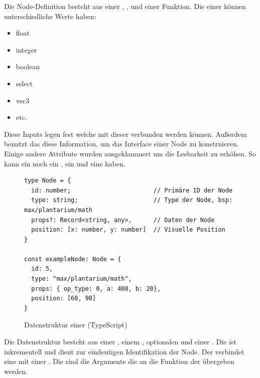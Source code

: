 \documentclass[ngerman]{article}
\begin{document}
Die Node-Definition besteht aus einer , ,  und einer  Funktion. Die  einer  können unterschiedliche  Werte haben:

\begin{itemize}
  \setlength\itemsep{0.0em}
  \item float
  \item integer
  \item boolean
  \item select
  \item vec3
  \item etc.
\end{itemize}

Diese Inputs legen fest welche  mit dieser  verbunden werden können. 
Außerdem benutzt das  diese Information, um das Interface einer Node zu konstruieren.
\br
Einige andere Attribute wurden ausgeklammert um die Lesbarkeit zu erhöhen. So kann ein  noch ein , ein  und eine  haben.

\pagebreak

\begin{figure}[htbp]
  \begin{code}
    \begin{verbatim}
type Node = {
  id: number;                       // Primäre ID der Node
  type: string;                     // Type der Node, bsp: max/plantarium/math
  props?: Record<string, any>,      // Daten der Node
  position: [x: number, y: number]  // Visuelle Position
}

const exampleNode: Node = {
  id: 5,
  type: "max/plantarium/math",
  props: { op_type: 0, a: 400, b: 20},
  position: [60, 90]
}

    \end{verbatim}
  \end{code}

  \caption{Datenstruktur einer  (TypeScript)}
  \label{fig:data_node}

\end{figure}

Die  Datenstruktur besteht aus einer , einem , optionalen  und einer . 
Die  ist inkrementell und dient zur eindeutigen Identifikation der Node. Der  verbindet eine  mit einer .
Die  sind die Argumente die an die  Funktion der  übergeben werden.
\end{document}
